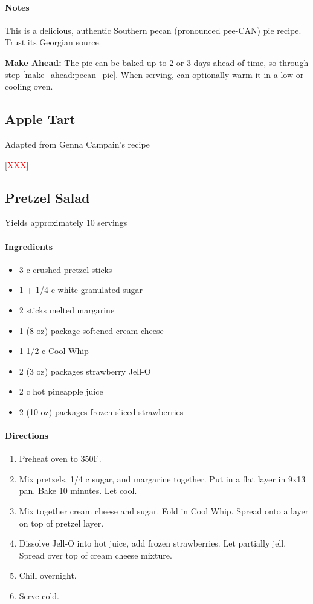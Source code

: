\documentclass[12pt]{article}
\newcommand{\TODO}{[\textcolor{red}{XXX}]}
\newenvironment*{ingredients}
	{
		\paragraph*{Ingredients}
		\begin{itemize}
	}
	{
		\end{itemize}
	}
\newenvironment*{directions}
	{
		\paragraph*{Directions}
		\begin{enumerate}
	}
	{
		\end{enumerate}
	}
\newenvironment*{notes}
	{
		\paragraph*{Notes}
		\begin{adjustwidth}{1cm}{}
	}
	{
		\end{adjustwidth}
	}
\begin{document}
	\begin{notes}
		This is a delicious, authentic Southern pecan (pronounced pee-CAN) pie recipe. Trust its Georgian source.
		
		\textbf{Make Ahead:} The pie can be baked up to 2 or 3 days ahead of time, so through step \ref{make_ahead:pecan_pie}. When serving, can optionally warm it in a low or cooling oven.
	\end{notes}
	
	\newpage
	
%	

	\subsection{Apple Tart}
	Adapted from Genna Campain's recipe
	
	\TODO
	
	\newpage
	
	\subsection{Pretzel Salad}
	Yields approximately 10 servings
	
	\begin{ingredients}
		\item 3 c crushed pretzel sticks
		\item 1 + 1/4 c white granulated sugar
		\item 2 sticks melted margarine
		\item 1 (8 oz) package softened cream cheese
		\item 1 1/2 c Cool Whip
		\item 2 (3 oz) packages strawberry Jell-O
		\item 2 c hot pineapple juice
		\item 2 (10 oz) packages frozen sliced strawberries
	\end{ingredients}
	
	\begin{directions}
		\item Preheat oven to 350F.
		\item Mix pretzels, 1/4 c sugar, and margarine together. Put in a flat layer in 9x13 pan. Bake 10 minutes. Let cool.
		\item Mix together cream cheese and sugar. Fold in Cool Whip. Spread onto a layer on top of pretzel layer.
		\item Dissolve Jell-O into hot juice, add frozen strawberries. Let partially jell. Spread over top of cream cheese mixture.
		\item Chill overnight. \label{make_ahead:pretzel_salad}
		\item Serve cold.
	\end{directions}
	
\end{document}
